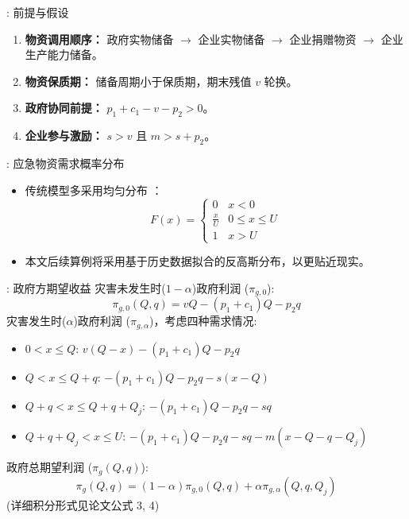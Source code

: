 \documentclass[9pt]{beamer}
\begin{document}
\begin{frame}{\insertsectionhead: 前提与假设}
    \begin{enumerate}
        \item \textbf{物资调用顺序：} 政府实物储备 $\rightarrow$ 企业实物储备 $\rightarrow$ 企业捐赠物资 $\rightarrow$ 企业生产能力储备。
        \item \textbf{物资保质期：} 储备周期小于保质期，期末残值 $v$ 轮换。
        \item \textbf{政府协同前提：} $p_1 + c_1 - v - p_2 > 0$。
        \item \textbf{企业参与激励：} $s > v$ 且 $m > s + p_2$。
    \end{enumerate}
\end{frame}

\begin{frame}{\insertsectionhead: 应急物资需求概率分布}
    \begin{itemize}
        \item 传统模型多采用均匀分布 \cite{chai2021考虑储备周期,chen2014突发事件灾前应急物资政企联合储备模式,hu2018考虑企业生产能力}：
            \begin{equation} \label{eq:beamer_uniform_cdf}
            F(x) = \begin{cases}
            0 & x < 0 \\
            \frac{x}{U} & 0 \leq x \leq U \\
            1 & x > U
            \end{cases}
            \end{equation}
        \item 本文后续算例将采用基于历史数据拟合的反高斯分布，以更贴近现实。
    \end{itemize}
\end{frame}

\begin{frame}{\insertsectionhead: 政府方期望收益}
    灾害未发生时($1-\alpha$)政府利润 ($\pi_{g,0}$):
    \begin{equation} \label{eq:beamer_profit_no_disaster_gov}
    \pi_{g,0}(Q,q) = v Q - (p_1 + c_1) Q - p_2 q
    \end{equation}
    灾害发生时($\alpha$)政府利润 ($\pi_{g,\alpha}$)，考虑四种需求情况:
    \begin{itemize}
        \item $0 < x \leq Q$: $v(Q-x) - (p_1+c_1)Q - p_2q$
        \item $Q < x \leq Q+q$: $-(p_1+c_1)Q - p_2q - s(x-Q)$
        \item $Q+q < x \leq Q+q+Q_j$: $-(p_1+c_1)Q - p_2q - sq$
        \item $Q+q+Q_j < x \leq U$: $-(p_1+c_1)Q - p_2q - sq - m(x-Q-q-Q_j)$
    \end{itemize}
    政府总期望利润 ($\pi_g(Q,q)$):
    \begin{equation} \label{eq:beamer_expected_profit_gov}
    \pi_g(Q,q) = (1-\alpha) \pi_{g,0}(Q,q) + \alpha \pi_{g,\alpha}(Q,q, Q_j)
    \end{equation}
    (详细积分形式见论文公式 3, 4)
\end{frame}
\end{document}
